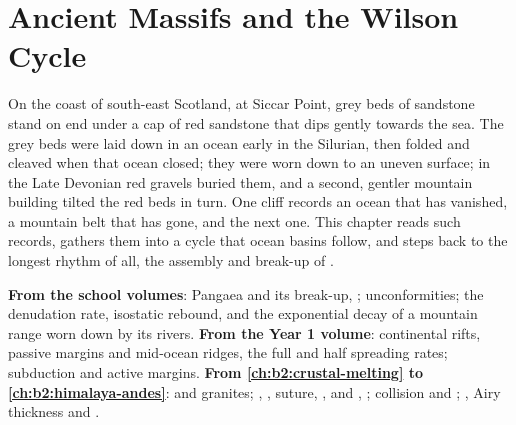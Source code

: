 \chapter{Ancient Massifs and the Wilson Cycle}\label{ch:b2:wilson-cycle}

On the coast of south-east Scotland, at Siccar Point, grey beds of sandstone stand on end
under a cap of red sandstone that dips gently towards the sea. The grey beds were laid down in
an ocean early in the Silurian, then folded and cleaved when that ocean closed; they were worn
down to an uneven surface; in the Late Devonian red gravels buried them, and a second,
gentler mountain building tilted the red beds in turn. One cliff records an ocean that has
vanished, a mountain belt that has gone, and the next one. This chapter reads such records,
gathers them into a cycle that ocean basins follow, and steps back to the longest rhythm of
all, the assembly and break-up of .

\begin{recall}
\textbf{From the school volumes}: Pangaea and its break-up, ; unconformities;
the denudation rate, isostatic rebound, and the exponential decay of a mountain range worn
down by its rivers. \textbf{From the Year 1 volume}: continental rifts, passive margins and
mid-ocean ridges, the full and half spreading rates; subduction and active margins.
\textbf{From \cref{ch:b2:crustal-melting} to \cref{ch:b2:himalaya-andes}}:  and
granites; , , suture, ,  and , ; collision and
; , Airy thickness and .
\end{recall}

